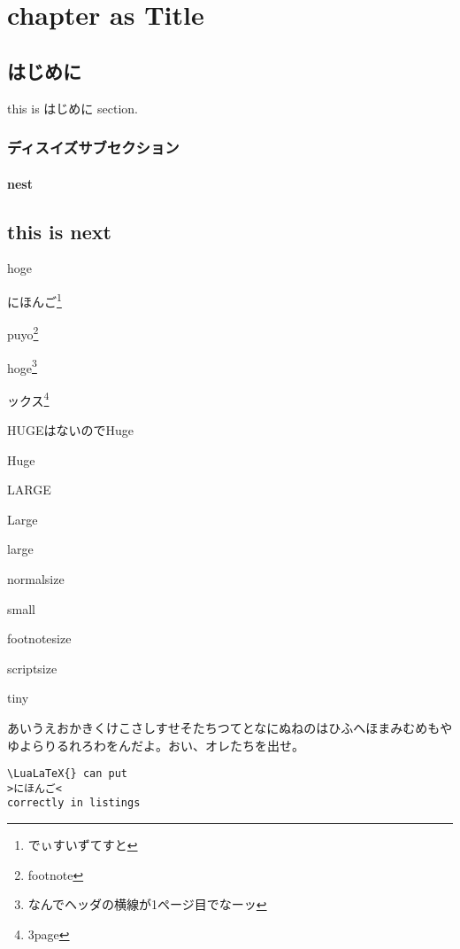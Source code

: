 \documentclass{word}
\author{WORD太郎}
\subtitle{subtitleだぴょん}
\begin{document}
\chapter{chapter as Title}

\section{はじめに}
this is はじめに section.

\subsection{ディスイズサブセクション}

\subsubsection{nest}

\section{this is next}

hoge

にほんご\footnote{でぃすいずてすと}

puyo\footnote{footnote}

hoge\footnote{なんでヘッダの横線が1ページ目でなーッ}

ックス\footnote{3page}

{\Huge HUGEはないのでHuge}

{\Huge Huge}

{\LARGE LARGE}

{\Large Large}

{\large large}

{\normalsize normalsize}

{\small small}

{\footnotesize footnotesize}

{\scriptsize scriptsize}

{\tiny tiny}

あいうえおかきくけこさしすせそたちつてとなにぬねのはひふへほまみむめもやゆよらりるれろわをんだよ。おい、オレたちを出せ。

\lstset{language=TeX,numbers=left}
\begin{lstlisting}
\LuaLaTeX{} can put
>にほんご<
correctly in listings
\end{lstlisting}


\end{document}
